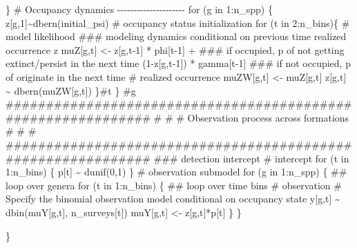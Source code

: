 \documentclass[
]{article}
\newenvironment{Shaded}{\begin{snugshade}}{\end{snugshade}}
\newcommand{\StringTok}[1]{\textcolor[rgb]{0.31,0.60,0.02}{#1}}
\begin{document}
{\begin{Shaded}
\begin{Highlighting}[]
\StringTok{        \}}
\StringTok{        }
\StringTok{        \# Occupancy dynamics {-}{-}{-}{-}{-}{-}{-}{-}{-}{-}{-}{-}{-}{-}{-}{-}{-}{-}{-}{-}{-}}
\StringTok{       }
\StringTok{        for (g in 1:n\_spp) \{}
\StringTok{         }
\StringTok{            z[g,1]\textasciitilde{}dbern(initial\_psi) \# occupancy status initialization}
\StringTok{      }
\StringTok{                for (t in 2:n\_bins)\{}
\StringTok{              }
\StringTok{                  \# model likelihood}
\StringTok{                  \#\#\# modeling dynamics conditional on previous time realized occurrence z}
\StringTok{                  muZ[g,t] \textless{}{-} z[g,t{-}1] *  phi[t{-}1] + \#\#\# if occupied, p of not getting extinct/persist in the next time}
\StringTok{                                (1{-}z[g,t{-}1]) *  gamma[t{-}1] \#\#\#  if not occupied, p of originate in the next time}
\StringTok{                  }
\StringTok{                 \# realized occurrence}
\StringTok{                 muZW[g,t] \textless{}{-} muZ[g,t]}
\StringTok{                   z[g,t] \textasciitilde{} dbern(muZW[g,t])}
\StringTok{              }
\StringTok{          \}\#t}
\StringTok{        }
\StringTok{        \} \#g}
\StringTok{  }
\StringTok{  }
\StringTok{    \#\#\#\#\#\#\#\#\#\#\#\#\#\#\#\#\#\#\#\#\#\#\#\#\#\#\#\#\#\#\#\#\#\#\#\#\#\#\#\#\#\#\#\#\#\#\#\#\#\#\#\#\#\#\#\#\#\#\#\#\#}
\StringTok{    \#                                                           \#}
\StringTok{    \#         Observation process across formations             \#}
\StringTok{    \#                                                           \#}
\StringTok{    \#\#\#\#\#\#\#\#\#\#\#\#\#\#\#\#\#\#\#\#\#\#\#\#\#\#\#\#\#\#\#\#\#\#\#\#\#\#\#\#\#\#\#\#\#\#\#\#\#\#\#\#\#\#\#\#\#\#\#\#\#}
\StringTok{    }
\StringTok{    \#\#\#  detection intercept}
\StringTok{    \# intercept    }
\StringTok{    for (t in 1:n\_bins) \{}
\StringTok{      p[t] \textasciitilde{} dunif(0,1) }
\StringTok{    \}}
\StringTok{    }
\StringTok{    \# observation submodel}
\StringTok{    for (g in 1:n\_spp) \{ \#\# loop over genera }
\StringTok{      }
\StringTok{      for (t in 1:n\_bins) \{ \#\# loop over time bins }
\StringTok{    }
\StringTok{          \# observation}
\StringTok{          \# Specify the binomial observation model conditional on occupancy state}
\StringTok{          y[g,t] \textasciitilde{} dbin(muY[g,t], n\_surveys[t])}
\StringTok{          muY[g,t] \textless{}{-} z[g,t]*p[t]}
\StringTok{                  }
\StringTok{        \}}
\StringTok{      }
\StringTok{    \}}
\StringTok{      }

\StringTok{\}}


\end{Highlighting}
\end{Shaded}}
\end{document}
